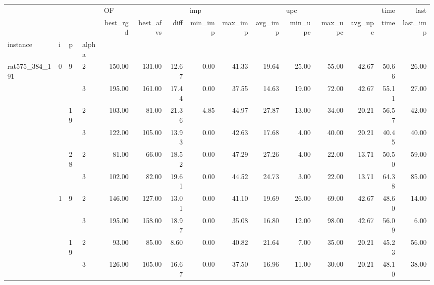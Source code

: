 \begin{tabular}{llllrrrrrrrrrrr}
\toprule
               &   &    &   & \multicolumn{3}{l}{OF} & \multicolumn{3}{l}{imp} & \multicolumn{3}{l}{upc} &   time &     last \\
               &   &    &   & best\_rgd & best\_afvs &  diff & min\_imp & max\_imp & avg\_imp & min\_upc & max\_upc & avg\_upc &   time & last\_imp \\
instance & i & p & alpha &          &           &       &         &         &         &         &         &         &        &          \\
\midrule
\multirow{60}{*}{rat575\_384\_191} & \multirow{6}{*}{0} & \multirow{2}{*}{9} & 2 &   150.00 &    131.00 & 12.67 &    0.00 &   41.33 &   19.64 &   25.00 &   55.00 &   42.67 &  50.66 &    26.00 \\
               &   &    & 3 &   195.00 &    161.00 & 17.44 &    0.00 &   37.55 &   14.63 &   19.00 &   72.00 &   42.67 &  55.11 &    27.00 \\
\cline{3-15}
               &   & \multirow{2}{*}{19} & 2 &   103.00 &     81.00 & 21.36 &    4.85 &   44.97 &   27.87 &   13.00 &   34.00 &   20.21 &  56.57 &    42.00 \\
               &   &    & 3 &   122.00 &    105.00 & 13.93 &    0.00 &   42.63 &   17.68 &    4.00 &   40.00 &   20.21 &  40.45 &    40.00 \\
\cline{3-15}
               &   & \multirow{2}{*}{28} & 2 &    81.00 &     66.00 & 18.52 &    0.00 &   47.29 &   27.26 &    4.00 &   22.00 &   13.71 &  50.50 &    59.00 \\
               &   &    & 3 &   102.00 &     82.00 & 19.61 &    0.00 &   44.52 &   24.73 &    3.00 &   22.00 &   13.71 &  64.38 &    85.00 \\
\cline{2-15}
\cline{3-15}
               & \multirow{6}{*}{1} & \multirow{2}{*}{9} & 2 &   146.00 &    127.00 & 13.01 &    0.00 &   41.10 &   19.69 &   26.00 &   69.00 &   42.67 &  48.60 &    14.00 \\
               &   &    & 3 &   195.00 &    158.00 & 18.97 &    0.00 &   35.08 &   16.80 &   12.00 &   98.00 &   42.67 &  56.09 &     6.00 \\
\cline{3-15}
               &   & \multirow{2}{*}{19} & 2 &    93.00 &     85.00 &  8.60 &    0.00 &   40.82 &   21.64 &    7.00 &   35.00 &   20.21 &  45.23 &    56.00 \\
               &   &    & 3 &   126.00 &    105.00 & 16.67 &    0.00 &   37.50 &   16.96 &   11.00 &   30.00 &   20.21 &  48.10 &    38.00 \\

\end{tabular}
